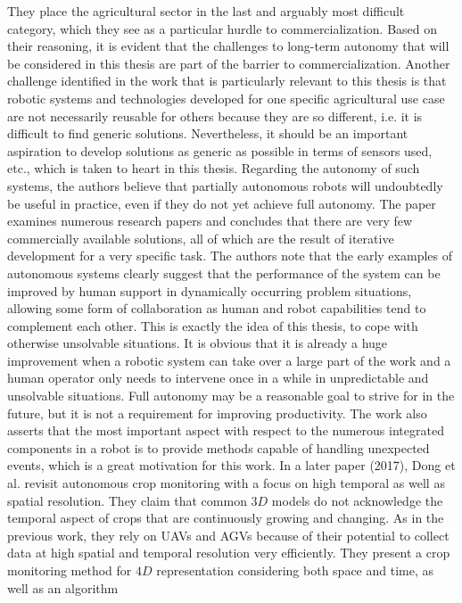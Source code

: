 \documentclass[english, master, utf8]{base/thesis_KBS}
\begin{document}
They place the agricultural sector in the last and arguably most difficult category, which they see as a particular hurdle to commercialization. Based on their reasoning, it is
evident that the challenges to long-term autonomy that will be considered in this thesis are part of the barrier to commercialization. Another challenge identified in the work that
is particularly relevant to this thesis is that robotic systems and technologies developed for one specific agricultural use case are not necessarily reusable for others because they
are so different, i.e. it is difficult to find generic solutions. Nevertheless, it should be an important aspiration to develop solutions as generic as possible in terms of sensors
used, etc., which is taken to heart in this thesis. Regarding the autonomy of such systems, the authors believe that partially autonomous robots will undoubtedly be useful in
practice, even if they do not yet achieve full autonomy. The paper examines numerous research papers and concludes that there are very few commercially available solutions, all of
which are the result of iterative development for a very specific task. The authors note that the early examples of autonomous systems clearly suggest that the performance of the
system can be improved by human support in dynamically occurring problem situations, allowing some form of collaboration as human and robot capabilities tend to complement each
other. This is exactly the idea of this thesis, to cope with otherwise unsolvable situations. It is obvious that it is already a huge improvement when a robotic system can take over
a large part of the work and a human operator only needs to intervene once in a while in unpredictable and unsolvable situations. Full autonomy may be a reasonable goal to strive for
in the future, but it is not a requirement for improving productivity. The work also asserts that the most important aspect with respect to the numerous integrated components in a
robot is to provide methods capable of handling unexpected events, which is a great motivation for this work.\newline
In a later paper (2017), Dong et al. \cite{Dong:2017} revisit autonomous crop monitoring with a focus on high temporal as well as spatial resolution. They claim that common $3D$ models do
not acknowledge the temporal aspect of crops that are continuously growing and changing. As in the previous work, they rely on UAVs and AGVs because of their potential to collect
data at high spatial and temporal resolution very efficiently. They present a crop monitoring method for $4D$ representation considering both space and time, as well as an algorithm
\end{document}
